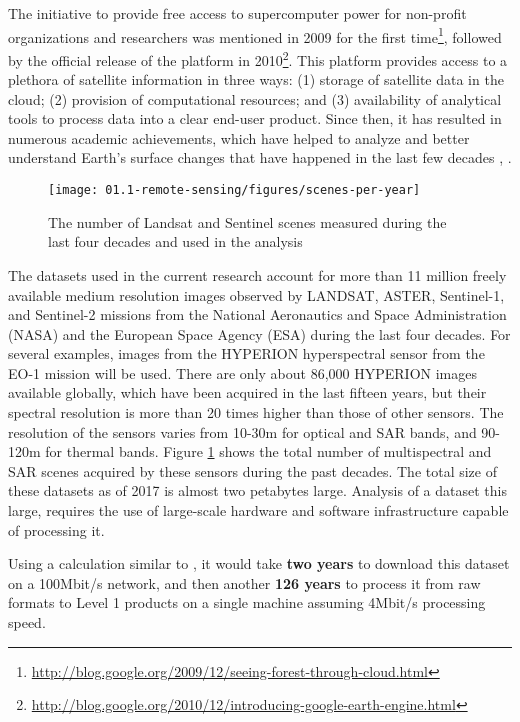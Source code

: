 The initiative to provide free access to supercomputer power for non-profit organizations and researchers was mentioned in 2009 for the first time\footnote{\url{http://blog.google.org/2009/12/seeing-forest-through-cloud.html}}, followed by the official release of the platform in 2010\footnote{\url{http://blog.google.org/2010/12/introducing-google-earth-engine.html}}. This platform provides access to a plethora of satellite information in three ways: (1) storage of satellite data in the cloud; (2) provision of computational resources; and (3) availability of analytical tools to process data into a clear end-user product. Since then, it has resulted in numerous academic achievements, which have helped to analyze and better understand Earth's surface changes that have happened in the last few decades \citet{Hansen2013}, \citet{pekel2016high}. 

\begin{figure}
	\centering
	\texttt{[image: 01.1-remote-sensing/figures/scenes-per-year]}
	\caption{The number of Landsat and Sentinel scenes measured during the last four decades and used in the analysis}
	\label{fig:sensor-count}
\end{figure}

The datasets used in the current research account for more than 11 million freely available medium resolution images observed by LANDSAT, ASTER, Sentinel-1, and Sentinel-2 missions from the National Aeronautics and Space Administration (NASA) and the European Space Agency (ESA) during the last four decades. For several examples, images from the HYPERION hyperspectral sensor from the EO-1 mission will be used. There are only about 86,000 HYPERION images available globally, which have been acquired in the last fifteen years, but their spectral resolution is more than 20 times higher than those of other sensors. The resolution of the sensors varies from 10-30m for optical and \gls{SAR} bands, and 90-120m for thermal bands. Figure \ref{fig:sensor-count} shows the total number of multispectral and \gls{SAR} scenes acquired by these sensors during the past decades. The total size of these datasets as of 2017 is almost two petabytes large. Analysis of a dataset this large, requires the use of large-scale hardware and software infrastructure capable of processing it.

Using a calculation similar to \citet{wagner2015big}, it would take \textbf{two years} to download this dataset on a 100Mbit/s network, and then another \textbf{126 years} to process it from raw formats to Level 1 products on a single machine assuming 4Mbit/s processing speed.

